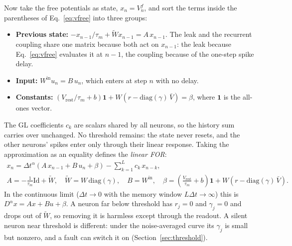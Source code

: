 \documentclass[11pt,a4paper]{article}
\newcommand{\Wt}{\tilde W}
\begin{document}
Now take the free potentials as state, $x_n = V^{f}_n$, and sort the terms inside the parentheses of Eq.~\eqref{eq:vfree} into three groups:
\begin{itemize}
  \item \textbf{Previous state:} $-x_{n-1}/\tau_m + \Wt x_{n-1} = A\, x_{n-1}$. The leak and the recurrent coupling share one matrix because both act on $x_{n-1}$: the leak because Eq.~\eqref{eq:vfree} evaluates it at $n-1$, the coupling because of the one-step spike delay.
  \item \textbf{Input:} $W^{\mathrm{in}} u_n = B\, u_n$, which enters at step $n$ with no delay.
  \item \textbf{Constants:} $(V_{\mathrm{rest}}/\tau_m + b)\mathbf{1} + W\left(r - \mathrm{diag}(\gamma)\,\bar V\right) = \beta$, where $\mathbf{1}$ is the all-ones vector.
\end{itemize}
The GL coefficients $c_k$ are scalars shared by all neurons, so the history sum carries over unchanged. No threshold remains: the state never resets, and the other neurons' spikes enter only through their linear response. Taking the approximation as an equality defines the \emph{linear FOR}:
\begin{equation}
\begin{gathered}
x_n = \Delta t^{\alpha}\left( A\, x_{n-1} + B\, u_n + \beta \right) - \sum_{k=1}^{L} c_k\, x_{n-k}, \\
A = -\tfrac{1}{\tau_m}\mathrm{Id} + \Wt,\quad \Wt = W\,\mathrm{diag}(\gamma),\quad B = W^{\mathrm{in}},\quad
\beta = \left( \tfrac{V_{\mathrm{rest}}}{\tau_m} + b \right)\mathbf{1} + W\left( r - \mathrm{diag}(\gamma)\,\bar V \right).
\end{gathered}
\label{eq:linfor}
\end{equation}
In the continuous limit ($\Delta t \to 0$ with the memory window $L\Delta t \to \infty$) this is $D^{\alpha}x = Ax + Bu + \beta$. A neuron far below threshold has $r_j = 0$ and $\gamma_j = 0$ and drops out of $\Wt$, so removing it is harmless except through the readout. A silent neuron near threshold is different: under the noise-averaged curve its $\gamma_j$ is small but nonzero, and a fault can switch it on (Section~\ref{sec:threshold}).
\end{document}
